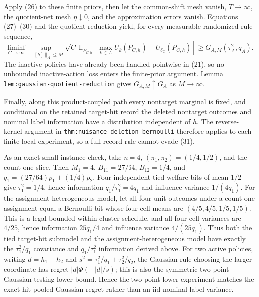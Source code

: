 Apply (26) to these finite priors, then let the common-shift mesh vanish, \(T\to\infty\), the quotient-net mesh \(\eta\downarrow0\), and the approximation errors vanish.  Equations (27)--(30) and the quotient reduction yield, for every measurable randomized rule sequence,
\[
\liminf_{C\to\infty}\sup_{\lVert[h]\rVert_A\leq M}
\sqrt C\,\mathbb E_{\bar P_{C,h}}
\left[\max_{k\in A}U_k(\bar P_{C,h})
-U_{\delta_C}(\bar P_{C,h})\right]
\geq G_{A,M}(\tau_A^2,q_A).
\tag{31}
\]
The inactive policies have already been handled pointwise in (21), so no unbounded inactive-action loss enters the finite-prior argument.  Lemma \texttt{lem:gaussian-quotient-reduction} gives \(G_{A,M}\uparrow G_A\) as \(M\to\infty\).

Finally, along this product-coupled path every nontarget marginal is fixed, and conditional on the retained target-hit record the deleted nontarget outcomes and nominal label information have a distribution independent of \(h\).  The reverse-kernel argument in \texttt{thm:nuisance-deletion-bernoulli} therefore applies to each finite local experiment, so a full-record rule cannot evade (31).

As an exact small-instance check, take \(n=4\), \((\pi_1,\pi_2)=(1/4,1/2)\), and the count-one slice.  Then \(M_1=4\), \(B_{11}=27/64\), \(B_{12}=1/4\), and \(q_1=(27/64)p_1+(1/4)p_2\).  Four independent tied welfare bits of mean \(1/2\) give \(\tau_1^2=1/4\), hence information \(q_1/\tau_1^2=4q_1\) and influence variance \(1/(4q_1)\).  For the assignment-heterogeneous model, let all four unit outcomes under a count-one assignment equal a Bernoulli bit whose four cell means are \((4/5,4/5,1/5,1/5)\).  This is a legal bounded within-cluster schedule, and all four cell variances are \(4/25\), hence information \(25q_1/4\) and influence variance \(4/(25q_1)\).  Thus both the tied target-bit submodel and the assignment-heterogeneous model have exactly the \(\tau_1^2/q_1\) covariance and \(q_1/\tau_1^2\) information derived above.  For two active policies, writing \(d=h_1-h_2\) and \(s^2=\tau_1^2/q_1+\tau_2^2/q_2\), the Gaussian rule choosing the larger coordinate has regret \(|d|\Phi(-|d|/s)\); this is also the symmetric two-point Gaussian testing lower bound.  Hence the two-point lower experiment matches the exact-hit pooled Gaussian regret rather than an iid nominal-label variance.